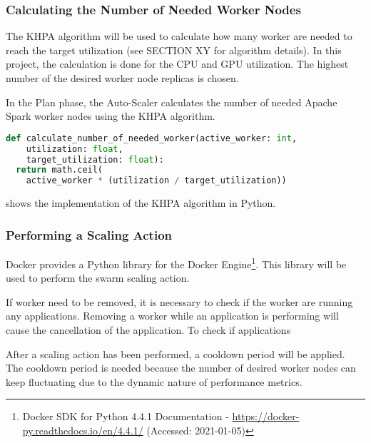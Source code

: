 

\subsubsection{Calculating the Number of Needed Worker Nodes}

%
%


The KHPA algorithm will be used to calculate how many worker are needed to reach the target utilization (see SECTION XY for algorithm details). 
In this project, the calculation is done for the CPU and GPU utilization. The highest number of the desired worker node replicas is chosen.


In the Plan phase, the Auto-Scaler calculates the number of needed Apache Spark worker nodes using the KHPA algorithm.
\begin{lstlisting}[label=lst:06_auto-scaler_plan_khpa, caption=KHPA implementation using Python 3.8, language=Python]
def calculate_number_of_needed_worker(active_worker: int,
    utilization: float,
    target_utilization: float):
  return math.ceil(
    active_worker * (utilization / target_utilization))
\end{lstlisting}
 shows the implementation of the KHPA algorithm in Python.


\subsubsection{Performing a Scaling Action}

%
%


Docker provides a Python library for the Docker Engine\footnote{Docker SDK for Python 4.4.1 Documentation - \url{https://docker-py.readthedocs.io/en/4.4.1/} (Accessed: 2021-01-05)}. This library will be used to perform the swarm scaling action.


If worker need to be removed, it is necessary to check if the worker are running any applications. Removing a worker while an application is performing will cause the cancellation of the application.
To check if applications 


After a scaling action has been performed, a cooldown period will be applied. The cooldown period is needed because the number of desired worker nodes can keep fluctuating due to the dynamic nature of performance metrics.

